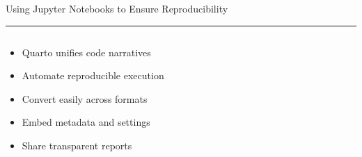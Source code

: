 \documentclass[aspectratio=169]{beamer}
\newcommand{\TitleFont}{\rmfamily}
\begin{document}
\begin{frame}[t]{}
  \vspace*{0.5cm}
  {\TitleFont\fontsize{18}{22}\selectfont\color{LUBronze}Using Jupyter Notebooks to Ensure Reproducibility\par}
  \vspace{0.3em}
  {\color{LUBronze}\rule{\linewidth}{0.8pt}}\par
  \vspace{0.2cm}
  \begin{columns}[t]
    \begin{column}[t]{0.4\textwidth}
      \vspace*{0pt}
      \begin{itemize}\setlength\itemsep{0.65em}
        \item Quarto unifies code narratives
        \item Automate reproducible execution
        \item Convert easily across formats
        \item Embed metadata and settings
        \item Share transparent reports
      \end{itemize}
    \end{column}
  \end{columns}
\end{frame}
\end{document}

